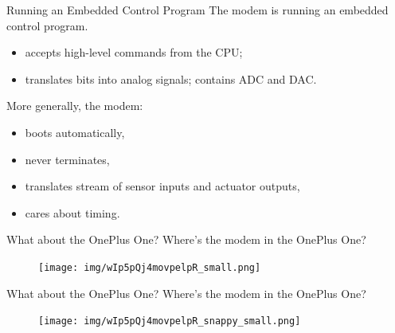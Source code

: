 \documentclass[aspectratio=169]{beamer}
\begin{document}
\begin{frame}{Running an Embedded Control Program}
The modem is running an \alert{embedded control program}.
\begin{itemize}
\item accepts high-level commands from the CPU;
\item translates bits into analog signals; contains ADC and DAC.
\end{itemize}

\vspace{1em}More generally, the modem:
\begin{itemize}
\item boots automatically,
\item never terminates,
\item translates stream of sensor inputs and actuator outputs,
\item cares about timing.
\end{itemize}
\end{frame}



\begin{frame}{What about the OnePlus One?}
Where's the modem in the OnePlus One? \\
\begin{figure}[b]
\centering
\texttt{[image: img/wIp5pQj4movpelpR\_small.png]}
\end{figure}
\end{frame}



\begin{frame}{What about the OnePlus One?}
Where's the modem in the OnePlus One? \\
\begin{figure}[b]
\centering
\texttt{[image: img/wIp5pQj4movpelpR\_snappy\_small.png]}
\end{figure}
\end{frame}
\end{document}
